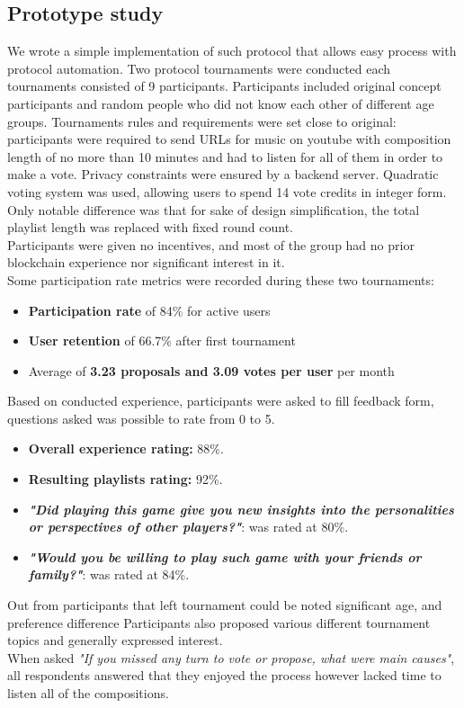 \documentclass{article}
\begin{document}
\begin{CJK}{UTF8}{gbsn}
\begin{multicols}{2}
        \subsection{Prototype study}
        We wrote a simple implementation of such protocol that allows easy process with protocol automation. Two protocol tournaments were conducted each tournaments consisted of 9 participants. Participants included original concept participants and random people who did not know each other of different age groups. Tournaments rules and requirements were set close to original: participants were required to send URLs for music on youtube with composition length of no more than 10 minutes and had to listen for all of them in order to make a vote. Privacy constraints were ensured by a backend server. Quadratic voting system was used, allowing users to spend 14 vote credits in integer form. Only notable difference  was that for sake of design simplification, the total playlist length was replaced with fixed round count.\\
        Participants were given no incentives, and most of the group had no prior blockchain experience nor significant interest in it.\\
        Some participation rate metrics were recorded during these two tournaments:
        \begin{itemize}[nosep]
            \item \textbf{Participation rate} of 84\% for active users
            \item \textbf{User retention} of 66.7\% after first tournament
            \item Average of \textbf{3.23 proposals and 3.09 votes per user} per month
        \end{itemize}

        Based on conducted experience, participants were asked to fill feedback form, questions asked was possible to rate from 0 to 5.
        \begin{itemize}
            \setlength\itemsep{2px}
            \item \textbf{Overall experience rating:} 88\%.
            \item \textbf{Resulting playlists rating:} 92\%.
            \item \textbf{\textit{"Did playing this game give you new insights into the personalities or perspectives of other players?"}}: was rated at 80\%.
            \item \textbf{\textit{"Would you be willing to play such game with your friends or family?"}}: was rated at 84\%.
        \end{itemize}
        Out from participants that left tournament could be noted significant age, and preference difference
        Participants also proposed various different tournament topics and generally expressed interest. \\When asked \textit{"If you missed any turn to vote or propose, what were main causes"}, all respondents answered that they enjoyed the process however lacked time to listen all of the compositions.




\end{multicols}
\end{CJK}
\end{document}
